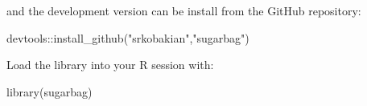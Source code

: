 and the development version can be install from the GitHub repository:

\begin{Schunk}
\begin{Sinput}
devtools::install_github("srkobakian","sugarbag")
\end{Sinput}
\end{Schunk}

Load the library into your R session with:

\begin{Schunk}
\begin{Sinput}
library(sugarbag)
\end{Sinput}
\end{Schunk}



\address{%
Stephanie Kobakian\\
Monash University\\%
Department of Econometrics and Business Statistics\\
%
%
%
\\\href{mailto:stephanie.kobakian@monash.edu}{\nolinkurl{stephanie.kobakian@monash.edu}}
}

\address{%
Dianne Cook\\
Monash University\\%
Department of Econometrics and Business Statistics\\
%
%
%
\\\href{mailto:dicook@monash.edu}{\nolinkurl{dicook@monash.edu}}
}
